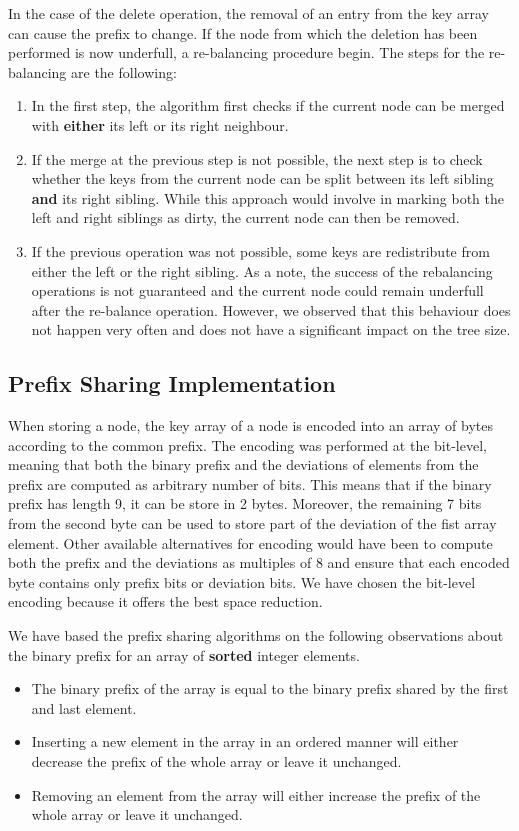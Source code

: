 \documentclass[11pt,a4paper,oneside]{article}
\begin{document}
In the case of the delete operation, the removal of an entry from the key array can cause the prefix to change. If the node from which the deletion has been performed is now underfull, a re-balancing procedure begin. The steps for the re-balancing are the following:
\begin{enumerate}
	\item In the first step, the algorithm first checks if the current node can be merged with \textbf{either} its left or its right neighbour. 
	\item If the merge at the previous step is not possible, the next step is to check whether the keys from the current node can be split between its left sibling \textbf{and} its right sibling. While this approach would involve in marking both the left and right siblings as dirty, the current node can then be removed.
	\item If the previous operation was not possible, some keys are redistribute from either the left or the right sibling. As a note, the success of the rebalancing operations is not guaranteed and the current node could remain underfull after the re-balance operation. However, we observed that this behaviour does not happen very often and does not have a significant impact on the tree size.
\end{enumerate}


\subsection{Prefix Sharing Implementation} %
\label{sub:prefix_sharing_rebalancing}
When storing a node, the key array of a node is encoded into an array of bytes according to the common prefix. The encoding was performed at the bit-level, meaning that both the binary prefix and the deviations of elements from the prefix are computed as arbitrary number of bits. This means that if the binary prefix has length 9, it can be store in 2 bytes. Moreover, the remaining 7 bits from the second byte can be used to store part of the deviation of the fist array element. Other available alternatives for encoding would have been to compute both the prefix and the deviations as multiples of 8 and ensure that each encoded byte contains only prefix bits or deviation bits. We have chosen the bit-level encoding because it offers the best space reduction.

We have based the prefix sharing algorithms on the following observations about the binary prefix for an array of \textbf{sorted} integer elements.
\begin{itemize}
	\item The binary prefix of the array is equal to the binary prefix shared by the first and last element.
	\item Inserting a new element in the array in an ordered manner will either decrease the prefix of the whole array or leave it unchanged.
	\item Removing an element from the array will either increase the prefix of the whole array or leave it unchanged.
\end{itemize}
\end{document}
